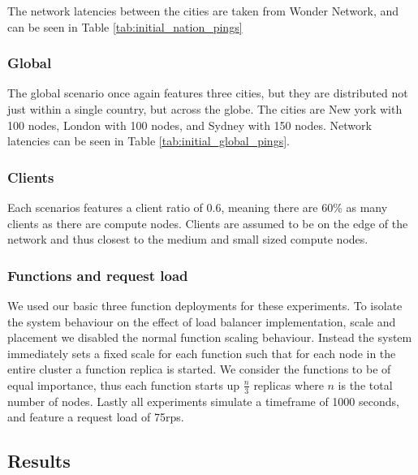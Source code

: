    

The network latencies between the cities are taken from Wonder Network\cite{wondernetworkGlobalPingStatistics}, and can be seen in Table \ref{tab:initial_nation_pings}

\subsubsection{Global}
The global scenario once again features three cities, but they are distributed not just within a single country, but across the globe.
The cities are New york with 100 nodes, London with 100 nodes, and Sydney with 150 nodes.
Network latencies can be seen in Table \ref{tab:initial_global_pings}.

\subsubsection{Clients}
Each scenarios features a client ratio of 0.6, meaning there are 60\% as many clients as there are compute nodes.
Clients are assumed to be on the edge of the network and thus closest to the medium and small sized compute nodes.

\subsubsection{Functions and request load}
We used our basic three function deployments for these experiments.
To isolate the system behaviour on the effect of load balancer implementation, scale and placement we disabled the normal function scaling behaviour.
Instead the system immediately sets a fixed scale for each function such that for each node in the entire cluster a function replica is started.
We consider the functions to be of equal importance, thus each function starts up $\frac{n}{3}$ replicas where $n$ is the total number of nodes.
Lastly all experiments simulate a timeframe of 1000 seconds, and feature a request load of 75\gls{rps}.

\subsection{Results}



